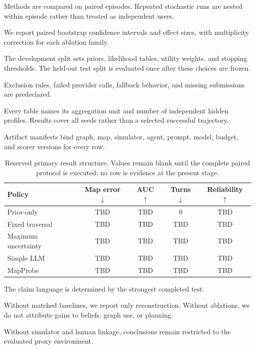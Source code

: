 Methods are compared on paired episodes. Repeated stochastic runs are nested within episode rather than
treated as independent users.

We report paired bootstrap confidence intervals and effect sizes, with multiplicity correction for each
ablation family.

The development split sets priors, likelihood tables, utility weights, and stopping thresholds. The
held-out test split is evaluated once after these choices are frozen.

Exclusion rules, failed provider calls, fallback behavior, and missing submissions are predeclared.

Every table names its aggregation unit and number of independent hidden profiles. Results cover all
seeds rather than a selected successful trajectory.

Artifact manifests bind graph, map, simulator, agent, prompt, model, budget, and scorer versions for
every row.

\begin{table}[t]
\caption{Reserved primary result structure. Values remain blank until the complete paired protocol is
executed; no row is evidence at the present stage.}
\label{tab:primary-results}
\centering
\small
\begin{tabularx}{\linewidth}{>{\raggedright\arraybackslash}Xcccc}
\toprule
\textbf{Policy} & \textbf{Map error $\downarrow$} & \textbf{AUC $\uparrow$} & \textbf{Turns $\downarrow$} & \textbf{Reliability $\uparrow$} \\
\midrule
Prior-only & TBD & TBD & 0 & TBD \\
Fixed traversal & TBD & TBD & TBD & TBD \\
Maximum uncertainty & TBD & TBD & TBD & TBD \\
Simple LLM & TBD & TBD & TBD & TBD \\
MapProbe & TBD & TBD & TBD & TBD \\
\bottomrule
\end{tabularx}
\end{table}

The claim language is determined by the strongest completed test.

Without matched baselines, we report only reconstruction. Without ablations, we do not attribute gains
to beliefs, graph use, or planning.

Without simulator and human linkage, conclusions remain restricted to the evaluated proxy environment.
